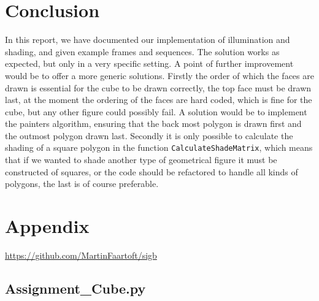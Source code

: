 \documentclass[a4paper,11pt]{article}
\begin{document}
\section{Conclusion}
In this report, we have documented our implementation of illumination and shading, and given example frames and sequences. The solution works as expected, but only in a very specific setting. A point of further improvement would be to offer a more generic solutions. Firstly the order of which the faces are drawn is essential for the cube to be drawn correctly, the top face must be drawn last, at the moment the ordering of the faces are hard coded, which is fine for the cube, but any other figure could possibly fail. A solution would be to implement the painters algorithm, ensuring that the back most polygon is drawn first and the outmost polygon drawn last. Secondly it is only possible to calculate the shading of a square polygon in the function \texttt{CalculateShadeMatrix}, which means that if we wanted to shade another type of geometrical figure it must be constructed of squares, or the code should be refactored to handle all kinds of polygons, the last is of course preferable.
\newpage
\section*{Appendix}
\url{https://github.com/MartinFaartoft/sigb}
\subsection*{Assignment\_Cube.py}

\end{document}
